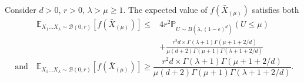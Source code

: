 \begin{thm}\label{thm:noncentered} 
Consider $d>0$, $r>0$, $\lambda>\mu \ge 1$.
The expected value of $f(\bar{X}_{(\mu)})$ satisfies both
\begin{align*}
\mathbb{E}_{X_{1}\ldots X_{\lambda}\sim\mathcal{B}(0,r)}\left[f(\bar{X}_{(\mu)})\right]\leq &4r^2\mathbb{P}_{U\sim B\left(\lambda,(1-\epsilon)^{d}\right)}\left(U\leq \mu\right)\\
&+\frac{r^2 d\times\Gamma(\lambda+1)\Gamma(\mu+1+2/d)}{\mu(d+2)\Gamma(\mu+1)\Gamma(\lambda+1+2/d)}
\end{align*}
$$\mbox{ and ~~}\mathbb{E}_{X_{1}\ldots X_{\lambda}\sim\mathcal{B}(0,r)}\left[f(\bar{X}_{(\mu)})\right]\geq \frac{r^2 d\times\Gamma(\lambda+1)\Gamma(\mu+1+2/d)}{\mu(d+2)\Gamma(\mu+1)\Gamma(\lambda+1+2/d)}.$$
\end{thm}

